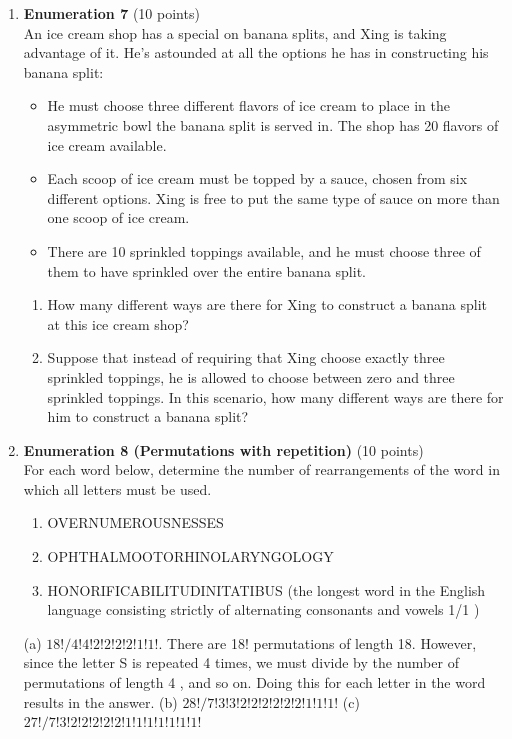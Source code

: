 \begin{enumerate}
  \item \textbf{Enumeration 7} (10 points)\\
  An ice cream shop has a special on banana splits, and Xing is taking advantage of it. He's astounded at all the options he has in constructing his banana split:
  \begin{itemize}
    \item He must choose three different flavors of ice cream to place in the asymmetric bowl the banana split is served in. The shop has 20 flavors of ice cream available.
    \item Each scoop of ice cream must be topped by a sauce, chosen from six different options. Xing is free to put the same type of sauce on more than one scoop of ice cream.
    \item There are 10 sprinkled toppings available, and he must choose three of them to have sprinkled over the entire banana split.
  \end{itemize}
  \begin{enumerate}[label=\alph*.]
    \item How many different ways are there for Xing to construct a banana split at this ice cream shop?
    \begin{subanswer}
    \end{subanswer}
    \item Suppose that instead of requiring that Xing choose exactly three sprinkled toppings, he is allowed to choose between zero and three sprinkled toppings. In this scenario, how many different ways are there for him to construct a banana split?
    \begin{subanswer}
    \end{subanswer}
  \end{enumerate}






  \item \textbf{Enumeration 8 (Permutations with repetition)} (10 points)\\
  For each word below, determine the number of rearrangements of the word in which all letters must be used.
  \begin{enumerate}[label=\alph*.]
    \item OVERNUMEROUSNESSES
    \item OPHTHALMOOTORHINOLARYNGOLOGY
    \item HONORIFICABILITUDINITATIBUS (the longest word in the English language consisting strictly of alternating consonants and vowels 1/1 )
  \end{enumerate}
  \begin{subanswer}
    (a) $18!/4!4!2!2!2!2!1!1!$. There are 18! permutations of length 18. However, since the letter S is repeated 4 times, we must divide by the number of permutations of length 4 , and so on. Doing this for each letter in the word results in the answer.
    (b) $28!/7!3!3!2!2!2!2!2!2!1!1!1!$
    (c) $27!/7!3!2!2!2!2!2!1!1!1!1!1!1!1!$
  \end{subanswer}



\end{enumerate}
